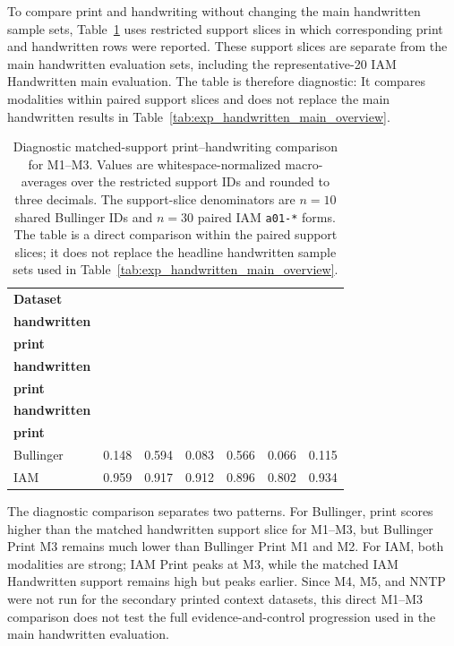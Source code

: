 To compare print and handwriting without changing the main handwritten sample sets, Table~\ref{tab:exp_print_handwriting_matched_support} uses restricted support slices in which corresponding print and handwritten rows were reported. These support slices are separate from the main handwritten evaluation sets, including the representative-20 IAM Handwritten main evaluation. The table is therefore diagnostic: It compares modalities within paired support slices and does not replace the main handwritten results in Table~\ref{tab:exp_handwritten_main_overview}.

\begin{table}[H]
  \centering
  \caption{Diagnostic matched-support print--handwriting comparison for M1--M3. Values are whitespace-normalized \LANormCombined{} macro-averages over the restricted support IDs and rounded to three decimals. The support-slice denominators are \(n=10\) shared Bullinger IDs and \(n=30\) paired IAM \texttt{a01-*} forms. The table is a direct comparison within the paired support slices; it does not replace the headline handwritten sample sets used in Table~\ref{tab:exp_handwritten_main_overview}.}
  \label{tab:exp_print_handwriting_matched_support}
  \footnotesize
  \setlength{\tabcolsep}{4pt}
  \renewcommand{\arraystretch}{1.10}
  \begin{tabular}{@{}l c c c c c c@{}}
    \toprule
    \textbf{Dataset} & \shortstack{\textbf{M1}\\\textbf{handwritten}} & \shortstack{\textbf{M1}\\\textbf{print}} & \shortstack{\textbf{M2}\\\textbf{handwritten}} & \shortstack{\textbf{M2}\\\textbf{print}} & \shortstack{\textbf{M3}\\\textbf{handwritten}} & \shortstack{\textbf{M3}\\\textbf{print}} \\
    \midrule
    Bullinger & 0.148 & 0.594 & 0.083 & 0.566 & 0.066 & 0.115 \\
    IAM & 0.959 & 0.917 & 0.912 & 0.896 & 0.802 & 0.934 \\
    \bottomrule
  \end{tabular}
\end{table}

The diagnostic comparison separates two patterns. For Bullinger, print scores higher than the matched handwritten support slice for M1--M3, but Bullinger Print M3 remains much lower than Bullinger Print M1 and M2. For IAM, both modalities are strong; IAM Print peaks at M3, while the matched IAM Handwritten support remains high but peaks earlier. Since M4, M5, and NNTP were not run for the secondary printed context datasets, this direct M1--M3 comparison does not test the full evidence-and-control progression used in the main handwritten evaluation.

